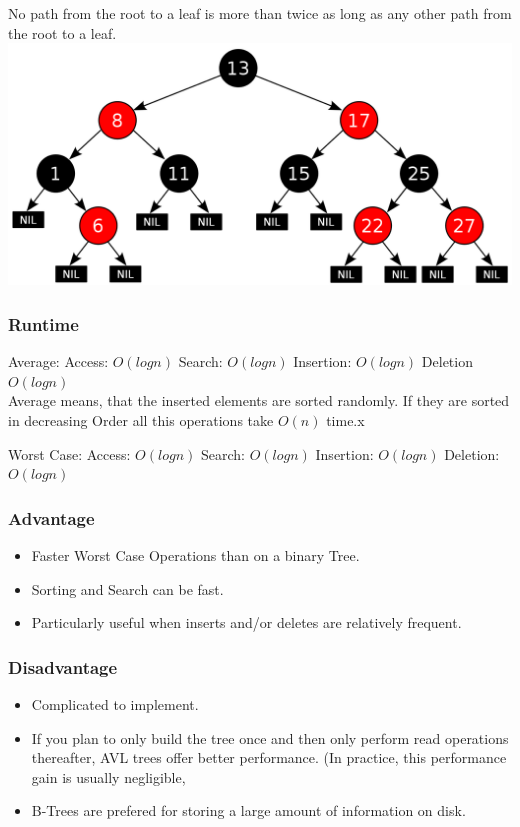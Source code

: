 \documentclass[12pt,a4paper]{article}
\newcommand{\RuntimeHead}{Runtime}
\newcommand{\AdvantageHead}{Advantage}
\newcommand{\DisadvantageHead}{Disadvantage}
\begin{document}
No path from the root to a leaf is more than twice as long as any other path from the root to a leaf.\\

\includegraphics[scale=0.3]{RedBlackTree}
\subsubsection{\RuntimeHead}
Average: 
Access: $O(log n) $
Search: $O(log n) $
Insertion: $O(log n) $
Deletion $O(log n) $\\
Average means, that the inserted elements are sorted randomly. If they are sorted in decreasing Order all this operations take $O(n)$ time.x

Worst Case: 
Access: $O(log n) $
Search: $O(log n) $
Insertion: $O(log n) $
Deletion: $O(log n) $ 
\subsubsection{\AdvantageHead}
\begin{itemize}
\item Faster Worst Case Operations than on a binary Tree.
\item Sorting and Search can be fast.
\item Particularly useful when inserts and/or deletes are relatively frequent.
\end{itemize}
\subsubsection{\DisadvantageHead}
\begin{itemize}
\item Complicated to implement.
\item If you plan to only build the tree once and then only perform read operations thereafter, AVL trees offer better performance. (In practice, this performance gain is usually negligible,
\item B-Trees are prefered for storing a large amount of information on disk.
\end{itemize}
\end{document}
